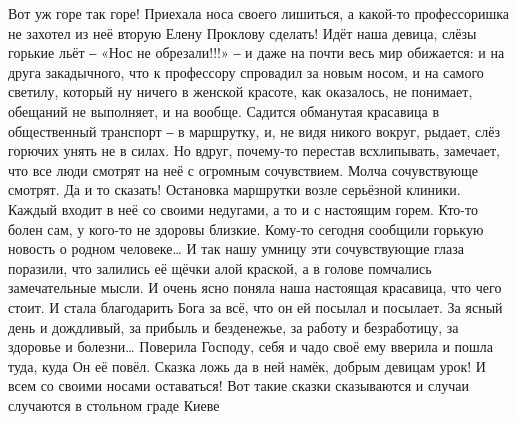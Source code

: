 Вот уж горе так горе! Приехала носа своего лишиться, а какой-то профессоришка не захотел из неё вторую Елену Проклову сделать! Идёт наша девица, слёзы горькие льёт ‒ «Нос не обрезали!!!» ‒ и даже на почти весь мир обижается: и на друга закадычного, что к профессору спровадил за новым носом, и на самого светилу, который ну ничего в женской красоте, как оказалось, не понимает, обещаний не выполняет, и на вообще. Садится обманутая красавица в общественный транспорт ‒ в маршрутку, и, не видя никого вокруг, рыдает, слёз горючих унять не в силах. Но вдруг, почему-то перестав всхлипывать, замечает, что все люди смотрят на неё с огромным сочувствием. Молча сочувствующе смотрят. Да и то сказать! Остановка маршрутки возле серьёзной клиники. Каждый входит в неё со своими недугами, а то и с настоящим горем. Кто-то болен сам, у кого-то не здоровы близкие. Кому-то сегодня сообщили горькую новость о родном человеке…  
И так нашу умницу эти сочувствующие глаза поразили, что залились её щёчки алой краской, а в голове помчались замечательные мысли. И очень ясно поняла наша настоящая красавица, что чего стоит. И стала благодарить Бога за всё, что он ей посылал и посылает. За ясный день и дождливый, за прибыль и безденежье, за работу и безработицу, за здоровье и болезни… Поверила Господу, себя и чадо своё ему вверила и пошла туда, куда Он её повёл. 
Сказка ложь да в ней намёк, добрым девицам урок!
И всем со своими носами оставаться!
Вот такие сказки сказываются и случаи случаются в стольном граде Киеве 🙂
